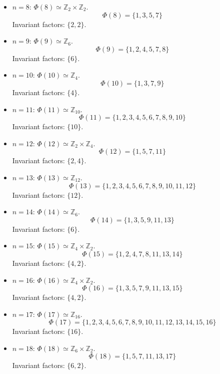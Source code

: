 \documentclass[12pt]{amsart}
\theoremstyle{definition}
\numberwithin{equation}{section}
\newcommand{\Z}{\mathbb{Z}}
\begin{document}
\begin{exercise}{8}
\begin{itemize}
        \item \(n = 8\): \(\Phi(8) \simeq \Z_2 \times \Z_2\).
        \[
        \Phi(8) = \{1, 3, 5, 7\}
        \]
        Invariant factors: \(\{2, 2\}\).

        \item \(n = 9\): \(\Phi(9) \simeq \Z_6\).
        \[
        \Phi(9) = \{1, 2, 4, 5, 7, 8\}
        \]
        Invariant factors: \(\{6\}\).

        \item \(n = 10\): \(\Phi(10) \simeq \Z_4\).
        \[
        \Phi(10) = \{1, 3, 7, 9\}
        \]
        Invariant factors: \(\{4\}\).

        \item \(n = 11\): \(\Phi(11) \simeq \Z_{10}\).
        \[
        \Phi(11) = \{1, 2, 3, 4, 5, 6, 7, 8, 9, 10\}
        \]
        Invariant factors: \(\{10\}\).

        \item \(n = 12\): \(\Phi(12) \simeq \Z_2 \times \Z_4\).
        \[
        \Phi(12) = \{1, 5, 7, 11\}
        \]
        Invariant factors: \(\{2, 4\}\).

        \item \(n = 13\): \(\Phi(13) \simeq \Z_{12}\).
        \[
        \Phi(13) = \{1, 2, 3, 4, 5, 6, 7, 8, 9, 10, 11, 12\}
        \]
        Invariant factors: \(\{12\}\).

        \item \(n = 14\): \(\Phi(14) \simeq \Z_6\).
        \[
        \Phi(14) = \{1, 3, 5, 9, 11, 13\}
        \]
        Invariant factors: \(\{6\}\).

        \item \(n = 15\): \(\Phi(15) \simeq \Z_4 \times \Z_2\).
        \[
        \Phi(15) = \{1, 2, 4, 7, 8, 11, 13, 14\}
        \]
        Invariant factors: \(\{4, 2\}\).

        \item \(n = 16\): \(\Phi(16) \simeq \Z_4 \times \Z_2\).
        \[
        \Phi(16) = \{1, 3, 5, 7, 9, 11, 13, 15\}
        \]
        Invariant factors: \(\{4, 2\}\).

        \item \(n = 17\): \(\Phi(17) \simeq \Z_{16}\).
        \[
        \Phi(17) = \{1, 2, 3, 4, 5, 6, 7, 8, 9, 10, 11, 12, 13, 14, 15, 16\}
        \]
        Invariant factors: \(\{16\}\).

        \item \(n = 18\): \(\Phi(18) \simeq \Z_6 \times \Z_2\).
        \[
        \Phi(18) = \{1, 5, 7, 11, 13, 17\}
        \]
        Invariant factors: \(\{6, 2\}\).


\end{itemize}
\end{exercise}
\end{document}
